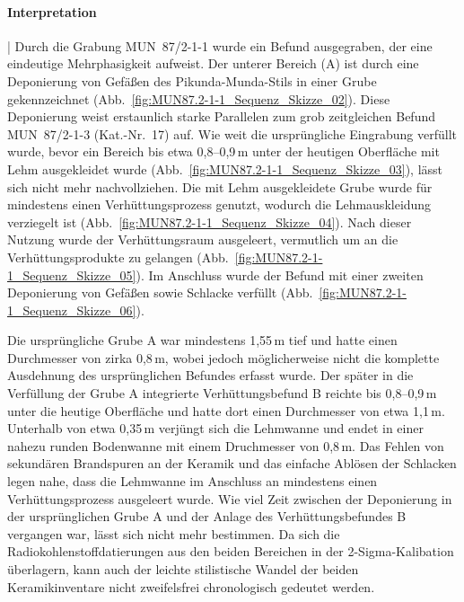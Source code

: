 \paragraph{Interpretation}\hspace{-.5em}|\hspace{.5em}%
Durch die Grabung MUN~87/2-1-1 wurde ein Befund ausgegraben, der eine eindeutige Mehrphasigkeit aufweist. Der unterer Bereich (A) ist durch eine Deponierung von Gefäßen des Pikunda-Munda-Stils in einer Grube gekennzeichnet (Abb.~\ref{fig:MUN87.2-1-1_Sequenz_Skizze_02}). Diese Deponierung weist erstaunlich starke Parallelen zum grob zeitgleichen Befund MUN~87/2-1-3 (Kat.-Nr.~17) auf. Wie weit die ursprüngliche Eingrabung verfüllt wurde, bevor ein Bereich bis etwa 0,8--0,9\,m unter der heutigen Oberfläche mit Lehm ausgekleidet wurde (Abb.~\ref{fig:MUN87.2-1-1_Sequenz_Skizze_03}), lässt sich nicht mehr nachvollziehen. Die mit Lehm ausgekleidete Grube wurde für mindestens einen Verhüttungsprozess genutzt, wodurch die Lehmauskleidung verziegelt ist (Abb.~\ref{fig:MUN87.2-1-1_Sequenz_Skizze_04}). Nach dieser Nutzung wurde der Verhüttungsraum ausgeleert, vermutlich um an die Verhüttungsprodukte zu gelangen (Abb.~\ref{fig:MUN87.2-1-1_Sequenz_Skizze_05}). Im Anschluss wurde der Befund mit einer zweiten Deponierung von Gefäßen sowie Schlacke verfüllt (Abb.~\ref{fig:MUN87.2-1-1_Sequenz_Skizze_06}).

Die ursprüngliche Grube A war mindestens 1,55\,m tief und hatte einen Durchmesser von zirka 0,8\,m, wobei jedoch möglicherweise nicht die komplette Ausdehnung des ursprünglichen Befundes erfasst wurde. Der später in die Verfüllung der Grube A integrierte Verhüttungsbefund B reichte bis 0,8--0,9\,m unter die heutige Oberfläche und hatte dort einen Durchmesser von etwa 1,1\,m. Unterhalb von etwa 0,35\,m verjüngt sich die Lehmwanne und endet in einer nahezu runden Bodenwanne mit einem Druchmesser von 0,8\,m. Das Fehlen von sekundären Brandspuren an der Keramik und das einfache Ablösen der Schlacken legen nahe, dass die Lehmwanne im Anschluss an mindestens einen Verhüttungsprozess ausgeleert wurde. Wie viel Zeit zwischen der Deponierung in der ursprünglichen Grube A und der Anlage des Verhüttungsbefundes B vergangen war, lässt sich nicht mehr bestimmen. Da sich die Radiokohlenstoffdatierungen aus den beiden Bereichen in der 2-Sigma-Kalibation überlagern, kann auch der leichte stilistische Wandel der beiden Keramikinventare nicht zweifelsfrei chronologisch gedeutet werden.